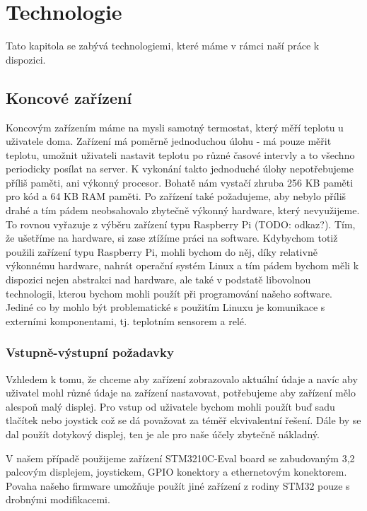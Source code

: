 \section{Technologie}
Tato kapitola se zabývá technologiemi, které máme v rámci naší práce k dispozici.

\subsection{Koncové zařízení}
Koncovým zařízením máme na mysli samotný termostat, který měří teplotu u uživatele doma.
Zařízení má poměrně jednoduchou úlohu - má pouze měřit teplotu, umožnit uživateli nastavit teplotu po
různé časové intervly a to všechno periodicky posílat na server.
K vykonání takto jednoduché úlohy nepotřebujeme příliš paměti, ani výkonný procesor.
Bohatě nám vystačí zhruba 256 KB paměti pro kód a 64 KB RAM paměti.
Po zařízení také požadujeme, aby nebylo příliš drahé a tím pádem neobsahovalo zbytečně výkonný
hardware, který nevyužijeme.
To rovnou vyřazuje z výběru zařízení typu Raspberry Pi (TODO: odkaz?).
Tím, že ušetříme na hardware, si zase ztížíme práci na software.
Kdybychom totiž použili zařízení typu Raspberry Pi, mohli bychom do něj, díky relativně
výkonnému hardware, nahrát operační systém Linux a tím pádem bychom měli k dispozici nejen
abstrakci nad hardware, ale také v podstatě libovolnou technologii, kterou bychom mohli použít
při programování našeho software.
Jediné co by mohlo být problematické s použitím Linuxu je komunikace s externími komponentami, tj.
teplotním sensorem a relé.


\subsubsection{Vstupně-výstupní požadavky}
Vzhledem k tomu, že chceme aby zařízení zobrazovalo aktuální údaje a navíc aby uživatel mohl
různé údaje na zařízení nastavovat, potřebujeme aby zařízení mělo alespoň malý displej.
Pro vstup od uživatele bychom mohli použít buď sadu tlačítek nebo joystick což se dá považovat
za téměř ekvivalentní řešení.
Dále by se dal použít dotykový displej, ten je ale pro naše účely zbytečně nákladný.

V našem případě použijeme zařízení STM3210C-Eval board se zabudovaným 3,2 palcovým displejem,
joystickem, GPIO konektory a ethernetovým konektorem.
Povaha našeho firmware umožňuje použít jiné zařízení z rodiny STM32 pouze s drobnými modifikacemi.

